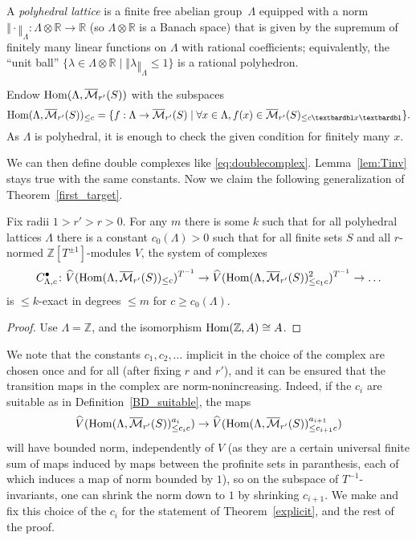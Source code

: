 \begin{definition}
  \label{polyhedral_lattice}
  A \emph{polyhedral lattice} is a finite free abelian group~$\Lambda$
  equipped with a norm $‖\cdot‖_\Lambda \colon \Lambda\otimes \mathbb R\to \mathbb R$
  (so $\Lambda\otimes \mathbb R$ is a Banach space)
  that is given by the supremum of finitely many linear functions on $\Lambda$ with rational coefficients;
  equivalently, the ``unit ball''
  $\{\lambda\in \Lambda\otimes \mathbb R\mid ‖\lambda‖_\Lambda\leq 1\}$ is a rational polyhedron.
\end{definition}

Endow $\operatorname{Hom}(\Lambda,\overline{\mathcal M}_{r'}(S))$ with the subspaces
\[
\Hom(\Lambda,\overline{\mathcal M}_{r'}(S))_{\leq c} = \{f: \Lambda\to \overline{\mathcal M}_{r'}(S)\mid \forall x\in \Lambda, f(x)\in \overline{\mathcal M}_{r'}(S)_{\leq c‖x‖}\}.
\]
As $\Lambda$ is polyhedral, it is enough to check the given condition for finitely many $x$.

We can then define double complexes like \eqref{eq:doublecomplex}.
Lemma~\ref{lem:Tinv} stays true with the same constants.
Now we claim the following generalization of Theorem~\ref{first_target}.

\begin{theorem}
  \label{explicit}
  Fix radii $1>r'>r>0$. For any $m$ there is some $k$
  such that for all polyhedral lattices $\Lambda$
  there is a constant $c_0(\Lambda)>0$
  such that for all finite sets $S$
  and all $r$-normed $\mathbb Z[T^{\pm 1}]$-modules $V$,
  the system of complexes
  \[
  C_{\Lambda,c}^\bullet \colon
  \widehat{V}(\operatorname{Hom}(\Lambda,\overline{\mathcal M}_{r'}(S))_{\leq c})^{T^{-1}} \to
  \widehat{V}(\operatorname{Hom}(\Lambda,\overline{\mathcal M}_{r'}(S))_{\leq c_1c}^2)^{T^{-1}} \to \ldots
  \]
  is $\leq k$-exact in degrees $\leq m$ for $c\geq c_0(\Lambda)$.
\end{theorem}

\begin{proof}
  Use $\Lambda = \mathbb Z$, and the isomorphism $\operatorname{Hom}(\mathbb Z, A) \cong A$.
\end{proof}

We note that the constants $c_1,c_2,\ldots$ implicit in the choice of the complex
are chosen once and for all (after fixing $r$ and $r'$),
and it can be ensured that the transition maps in the complex are norm-nonincreasing.
Indeed, if the $c_i$ are suitable as in Definition~\ref{BD_suitable},
the maps
\[
\widehat{V}(\operatorname{Hom}(\Lambda,\overline{\mathcal M}_{r'}(S))_{\leq c_ic}^{a_i})\to \widehat{V}(\operatorname{Hom}(\Lambda,\overline{\mathcal M}_{r'}(S))_{\leq c_{i+1}c}^{a_{i+1}})
\]
will have bounded norm, independently of $V$ (as they are a certain universal finite sum of maps induced by maps between the profinite sets in paranthesis, each of which induces a map of norm bounded by $1$), so on the subspace of $T^{-1}$-invariants, one can shrink the norm down to $1$ by shrinking $c_{i+1}$. We make and fix this choice of the $c_i$ for the statement of Theorem~\ref{explicit}, and the rest of the proof.


